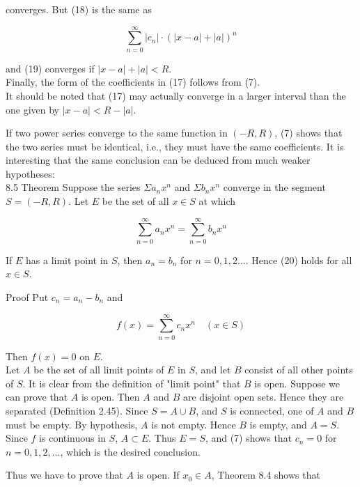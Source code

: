 \documentclass[10pt]{article}
\begin{document}
converges. But (18) is the same as


\begin{equation*}
\sum_{n=0}^{\infty}\left|c_{n}\right| \cdot(|x-a|+|a|)^{n} \tag{19}
\end{equation*}


and (19) converges if $|x-a|+|a|<R$.\\
Finally, the form of the coefficients in (17) follows from (7).\\
It should be noted that (17) may actually converge in a larger interval than the one given by $|x-a|<R-|a|$.

If two power series converge to the same function in $(-R, R)$, (7) shows that the two series must be identical, i.e., they must have the same coefficients. It is interesting that the same conclusion can be deduced from much weaker hypotheses:\\
8.5 Theorem Suppose the series $\Sigma a_{n} x^{n}$ and $\Sigma b_{n} x^{n}$ converge in the segment $S=(-R, R)$. Let $E$ be the set of all $x \in S$ at which


\begin{equation*}
\sum_{n=0}^{\infty} a_{n} x^{n}=\sum_{n=0}^{\infty} b_{n} x^{n} \tag{20}
\end{equation*}


If $E$ has a limit point in $S$, then $a_{n}=b_{n}$ for $n=0,1,2 \ldots$. Hence (20) holds for all $x \in S$.

Proof Put $c_{n}=a_{n}-b_{n}$ and


\begin{equation*}
f(x)=\sum_{n=0}^{\infty} c_{n} x^{n} \quad(x \in S) \tag{21}
\end{equation*}


Then $f(x)=0$ on $E$.\\
Let $A$ be the set of all limit points of $E$ in $S$, and let $B$ consist of all other points of $S$. It is clear from the definition of "limit point" that $B$ is open. Suppose we can prove that $A$ is open. Then $A$ and $B$ are disjoint open sets. Hence they are separated (Definition 2.45). Since $S=A \cup B$, and $S$ is connected, one of $A$ and $B$ must be empty. By hypothesis, $A$ is not empty. Hence $B$ is empty, and $A=S$. Since $f$ is continuous in $S$, $A \subset E$. Thus $E=S$, and (7) shows that $c_{n}=0$ for $n=0,1,2, \ldots$, which is the desired conclusion.

Thus we have to prove that $A$ is open. If $x_{0} \in A$, Theorem 8.4 shows that
\end{document}
